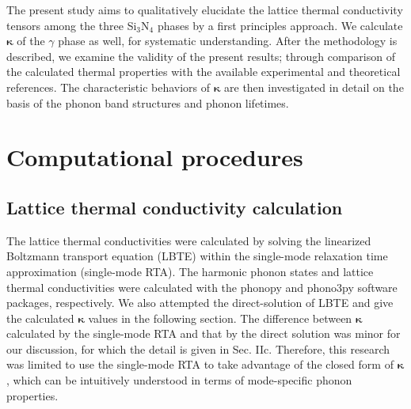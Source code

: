 \documentclass[twocolumn,amsmath,amssymb,a4paper,prb,superscriptaddress,floatfix]{revtex4-1}
\begin{document}
The present study aims to qualitatively elucidate the lattice thermal
conductivity tensors among the three Si$_3$N$_4$ phases by a first principles
approach.  We calculate $\boldsymbol{\kappa}$ of the $\gamma$ phase as well, for
systematic understanding. After the methodology is described, we
examine the validity of the present results; through comparison
of the calculated thermal properties with the available experimental and
theoretical references. 
The characteristic behaviors of  $\boldsymbol{\kappa}$
are then investigated in detail on the basis of the phonon band structures and
phonon lifetimes.

\section{Computational procedures}

\subsection{Lattice thermal conductivity calculation}

The lattice thermal conductivities were calculated by solving the linearized
Boltzmann transport equation (LBTE) within the single-mode relaxation time
approximation (single-mode RTA).  The harmonic phonon states and lattice
thermal conductivities were calculated with the phonopy\cite{phonopy} and
phono3py\cite{phono3py} software packages, respectively.  We also attempted the
direct-solution of LBTE\cite{chaput-direct} and give the calculated
$\boldsymbol{\kappa}$ values in the following section. The difference between
$\boldsymbol{\kappa}$ calculated by the single-mode RTA and that by the direct
solution was minor for our discussion, for which the detail is given in Sec.
IIc. Therefore, this research was limited to use the single-mode RTA to take
advantage of the closed form of $\boldsymbol{\kappa}$, which can be intuitively
understood in terms of mode-specific phonon properties.
\end{document}
